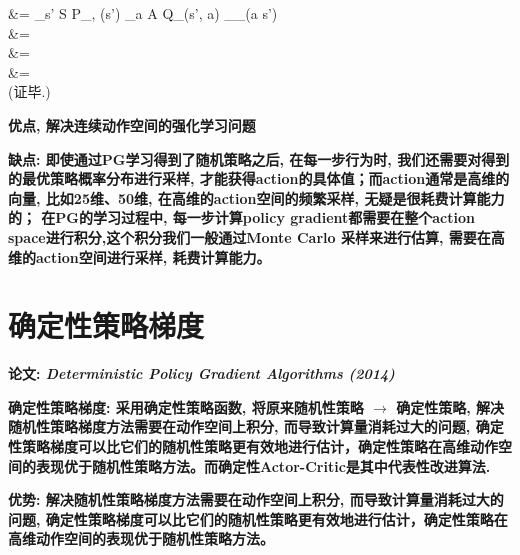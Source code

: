 {                &= \alpha \sum\limits_{s' \in S} \mathbb P_{\mu, \pi}(s') \sum_{a \in A} Q_{\pi}(s', a) \nabla_\theta {}_\pi (a \mid s')  \\
                &= \alpha {}  \\
                &= \alpha {}  \\
                &= \alpha {}  \\
            }
            (证毕.)
            
        \bf{优点}, 解决连续动作空间的强化学习问题
        
        \bf{缺点}:
            即使通过PG学习得到了随机策略之后, 在每一步行为时, 我们还需要对得到的最优策略概率分布进行采样, 才能获得action的具体值；而action通常是高维的向量, 比如25维、50维, 在高维的action空间的频繁采样, 无疑是很耗费计算能力的； 在PG的学习过程中, 每一步计算policy gradient都需要在整个action space进行积分,这个积分我们一般通过Monte Carlo 采样来进行估算, 需要在高维的action空间进行采样, 耗费计算能力。

            
    \section{确定性策略梯度} 
        \bf{论文}: \textit{Deterministic Policy Gradient Algorithms (2014)}

        \bf{确定性策略梯度}: 采用确定性策略函数, 将原来\bf{随机性策略 $\to$ 确定性策略}, 解决随机性策略梯度方法需要在动作空间上积分, 而导致计算量消耗过大的问题, 确定性策略梯度可以比它们的随机性策略更有效地进行估计，确定性策略在高维动作空间的表现优于随机性策略方法。而确定性Actor-Critic是其中代表性改进算法.

        \bf{优势}: 解决随机性策略梯度方法需要在动作空间上积分, 而导致计算量消耗过大的问题, 确定性策略梯度可以比它们的随机性策略更有效地进行估计，确定性策略在高维动作空间的表现优于随机性策略方法。
        

